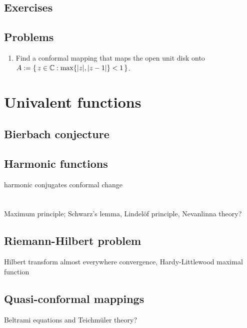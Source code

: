 \documentclass{../note}
\begin{document}
\section*{Exercises}
\begin{prb}
\end{prb}
\begin{prb}
\end{prb}

\section*{Problems}
\begin{enumerate}
\item Find a conformal mapping that maps the open unit disk onto $A:=\{\,z\in\mathbb{C}:\max\{|z|,|z-1|\}<1\,\}$.
\end{enumerate}

\chapter{Univalent functions}
\section{Bierbach conjecture}
\section{Harmonic functions}
harmonic conjugates
conformal change






\chapter{}

Maximum principle; Schwarz's lemma, Lindelöf principle,
Nevanlinna theory?

\section{Riemann-Hilbert problem}
Hilbert transform
almost everywhere convergence, Hardy-Littlewood maximal function

\section{Quasi-conformal mappings}
Beltrami equations and Teichm\"uler theory?
\end{document}
